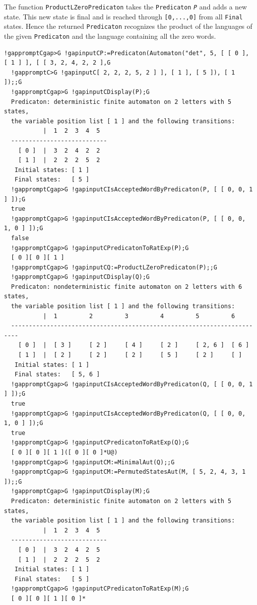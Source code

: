 \documentclass[a4paper,11pt]{report}
\begin{document}
{{{ The function \texttt{ProductLZeroPredicaton} takes the \texttt{Predicaton} \mbox{\texttt{\mdseries\slshape P}} and adds a new state. This new state is final and is reached through \texttt{[0,...,0]} from all \texttt{Final} states. Hence the returned \texttt{Predicaton} recognizes the product of the languages of the given \texttt{Predicaton} and the language containing all the zero words. 
\begin{Verbatim}[commandchars=!CG,fontsize=\small,frame=single,label=Example]
  !gappromptCgap>G !gapinputCP:=Predicaton(Automaton("det", 5, [ [ 0 ], [ 1 ] ], [ [ 3, 2, 4, 2, 2 ],G
  !gappromptC>G !gapinputC[ 2, 2, 2, 5, 2 ] ], [ 1 ], [ 5 ]), [ 1 ]);;G
  !gappromptCgap>G !gapinputCDisplay(P);G
  Predicaton: deterministic finite automaton on 2 letters with 5 states, 
  the variable position list [ 1 ] and the following transitions:
           |  1  2  3  4  5  
  ---------------------------
    [ 0 ]  |  3  2  4  2  2  
    [ 1 ]  |  2  2  2  5  2  
   Initial states: [ 1 ]
   Final states:   [ 5 ]
  !gappromptCgap>G !gapinputCIsAcceptedWordByPredicaton(P, [ [ 0, 0, 1 ] ]);G
  true
  !gappromptCgap>G !gapinputCIsAcceptedWordByPredicaton(P, [ [ 0, 0, 1, 0 ] ]);G
  false
  !gappromptCgap>G !gapinputCPredicatonToRatExp(P);G
  [ 0 ][ 0 ][ 1 ]
  !gappromptCgap>G !gapinputCQ:=ProductLZeroPredicaton(P);;G
  !gappromptCgap>G !gapinputCDisplay(Q);G
  Predicaton: nondeterministic finite automaton on 2 letters with 6 states, 
  the variable position list [ 1 ] and the following transitions:
           |  1         2         3         4         5         6         
  ------------------------------------------------------------------------
    [ 0 ]  |  [ 3 ]     [ 2 ]     [ 4 ]     [ 2 ]     [ 2, 6 ]  [ 6 ]     
    [ 1 ]  |  [ 2 ]     [ 2 ]     [ 2 ]     [ 5 ]     [ 2 ]     [ ]       
   Initial states: [ 1 ]
   Final states:   [ 5, 6 ]
  !gappromptCgap>G !gapinputCIsAcceptedWordByPredicaton(Q, [ [ 0, 0, 1 ] ]);G
  true
  !gappromptCgap>G !gapinputCIsAcceptedWordByPredicaton(Q, [ [ 0, 0, 1, 0 ] ]);G
  true
  !gappromptCgap>G !gapinputCPredicatonToRatExp(Q);G
  [ 0 ][ 0 ][ 1 ]([ 0 ][ 0 ]*U@)
  !gappromptCgap>G !gapinputCM:=MinimalAut(Q);;G
  !gappromptCgap>G !gapinputCM:=PermutedStatesAut(M, [ 5, 2, 4, 3, 1 ]);;G
  !gappromptCgap>G !gapinputCDisplay(M);G
  Predicaton: deterministic finite automaton on 2 letters with 5 states, 
  the variable position list [ 1 ] and the following transitions:
           |  1  2  3  4  5  
  ---------------------------
    [ 0 ]  |  3  2  4  2  5  
    [ 1 ]  |  2  2  2  5  2  
   Initial states: [ 1 ]
   Final states:   [ 5 ]
  !gappromptCgap>G !gapinputCPredicatonToRatExp(M);G
  [ 0 ][ 0 ][ 1 ][ 0 ]*
\end{Verbatim}
 }

}}
\end{document}

